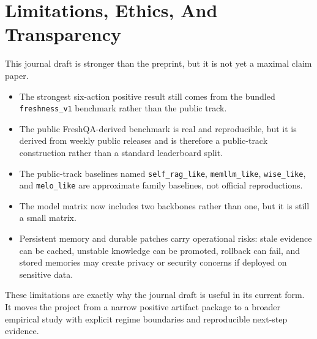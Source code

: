 \section{Limitations, Ethics, And Transparency}

This journal draft is stronger than the preprint, but it is not yet a maximal claim paper.

\begin{itemize}[leftmargin=1.5em]
\item The strongest six-action positive result still comes from the bundled \texttt{freshness\_v1} benchmark rather than the public track.
\item The public FreshQA-derived benchmark is real and reproducible, but it is derived from weekly public releases and is therefore a public-track construction rather than a standard leaderboard split.
\item The public-track baselines named \texttt{self\_rag\_like}, \texttt{memllm\_like}, \texttt{wise\_like}, and \texttt{melo\_like} are approximate family baselines, not official reproductions.
\item The model matrix now includes two backbones rather than one, but it is still a small matrix.
\item Persistent memory and durable patches carry operational risks: stale evidence can be cached, unstable knowledge can be promoted, rollback can fail, and stored memories may create privacy or security concerns if deployed on sensitive data.
\end{itemize}

These limitations are exactly why the journal draft is useful in its current form. It moves the project from a narrow positive artifact package to a broader empirical study with explicit regime boundaries and reproducible next-step evidence.
